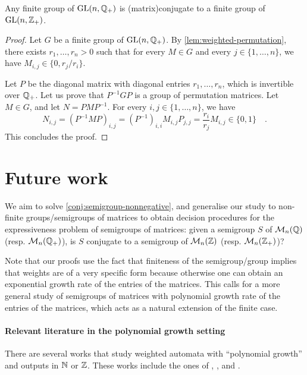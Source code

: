 \begin{theorem}
  \label{thm:group-nonnegative}
  Any finite group of $\GL[n]{\Rat_+}$ is \kl(matrix){conjugate} to a finite group of
  $\GL[n]{\Int_+}$.
\end{theorem}
\begin{proof}
  Let $G$ be a finite group of $\GL[n]{\Rat_+}$.
  By \cref{lem:weighted-permutation}, there exists $r_1, \ldots, r_n > 0$ such that
  for every $M \in G$ and every $j \in \{1,
  \ldots, n\}$, we have $M_{i,j} \in \{0, r_j/r_i\}$.

  Let $P$ be the diagonal matrix with diagonal entries $r_1, \ldots, r_n$,
  which is invertible over $\Rat_+$.
  Let us prove that $P^{-1} G P$ is a group of permutation matrices.
  Let $M \in G$, and let $N = P M P^{-1}$.
  For every $i, j \in \{1, \ldots, n\}$, we have
  \begin{equation}
    N_{i,j} = (P^{-1} M P)_{i,j}
    = (P^{-1})_{i,i} M_{i,j} P_{j,j}
    = \frac{r_i}{r_j} M_{i,j} \in \{0, 1\}
    \quad .
  \end{equation}  
  This concludes the proof.
\end{proof}

\section{Future work}

We aim to solve \cref{conj:semigroup-nonnegative}, and generalise our study to
non-finite groups/semigroups of matrices to obtain decision procedures for the
expressiveness problem of semigroups of matrices: given a semigroup $S$ of
$\Mat[n]{\Rat}$ (resp. $\Mat[n]{\Rat_+}$), is $S$ conjugate to a semigroup of
$\Mat[n]{\Int}$ (resp. $\Mat[n]{\Int_+}$)?

Note that our proofs use the fact that finiteness of the semigroup/group
implies that weights are of a very specific form because otherwise one can
obtain an exponential growth rate of the entries of the matrices. This calls
for a more general study of semigroups of matrices with polynomial growth rate
of the entries of the matrices, which acts as a natural extension of the
finite case.


\paragraph*{Relevant literature in the polynomial growth setting} There are
several works that study weighted automata with ``polynomial growth'' and
outputs in $\Nat$ or $\Int$. These works include the ones of \cite{KRRC13},
\cite{CDTL23}, and \cite{LOPEZ25}.


